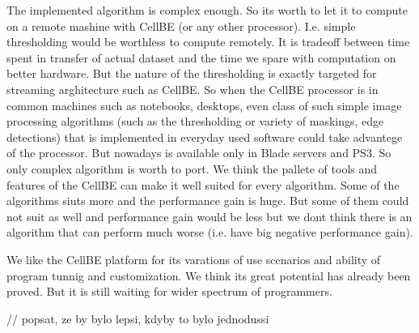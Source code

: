 \par
The implemented algorithm is complex enough.
So its worth to let it to compute on a remote mashine with CellBE (or any other processor).
I.e. simple thresholding would be worthless to compute remotely.
It is tradeoff between time spent in transfer of actual dataset and the time we spare with computation on better hardware.
But the nature of the thresholding is exactly targeted for streaming arghitecture such as CellBE.
So when the CellBE processor is in common machines such as notebooks, desktops, even class of such simple image processing algorithms (such as the thresholding or variety of maskings, edge detections) that is implemented in everyday used software could take advantege of the processor.
But nowadays is available only in Blade servers and PS3.
So only complex algorithm is worth to port.
We think the pallete of tools and features of the CellBE can make it well suited for every algorithm.
Some of the algorithms siuts more and the performance gain is huge.
But some of them could not suit as well and performance gain would be less but we dont think there is an algorithm that can perform much worse (i.e. have big negative performance gain).

We like the CellBE platform for its varations of use scenarios and ability of program tunnig and customization.
We think its great potential has already been proved.
But it is still waiting for wider spectrum of programmers.

// popsat, ze by bylo lepsi, kdyby to bylo jednodussi